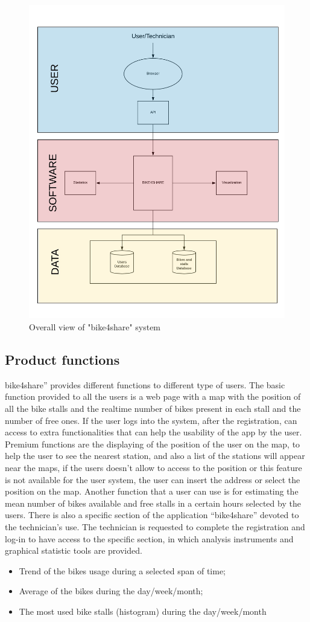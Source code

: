 \documentclass{article}
\begin{document}
\begin{figure}[h]
    \centering
    \includegraphics[width=0.75\linewidth]{image/overallview.PNG}
    \caption{Overall view of "bike4share" system}
    \label{fig:schema}
\end{figure}

\subsection{Product functions}
bike4share” provides different functions to different type of users. 
The basic function provided to all the users is a web page with a map with the position of all the bike stalls and the realtime number of bikes present in each stall and the number of free ones.
If the user logs into the system, after the registration, can access to extra functionalities that can help the usability of the app by the user. Premium functions are the displaying of the position of the user on the map, to help the user to see the nearest station, and also a list of the stations will appear near the maps, if the users doesn’t allow to access to the position or this feature is not available for the user system, the user can insert the address or select the position on the map. Another function that a user can use is for estimating the mean number of bikes available and free stalls in a certain hours selected by the users. 
There is also a specific section of the application “bike4share” devoted to the technician’s use. The technician is requested to complete the registration and log-in to have access to the specific section, in which analysis instruments and graphical statistic tools are provided. 
\begin{itemize}
    \item Trend of the bikes usage during a selected span of time;
    \item Average of the bikes during the day/week/month;
    \item The most used bike stalls (histogram) during the day/week/month
\end{itemize}
\end{document}
